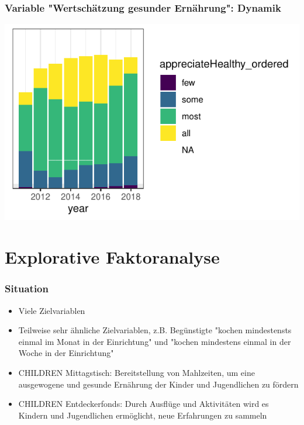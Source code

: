 \begin{frame}[fragile]
\frametitle{Variable "Wertschätzung gesunder Ernährung": Dynamik}
\begin{knitrout}\footnotesize
{}\color{fgcolor}

{\centering \includegraphics[width=\maxwidth]{figure/beamer-appreciateTime-1} 

}



\end{knitrout}
\end{frame}

\section{Explorative Faktoranalyse}

\begin{frame}[fragile]
\frametitle{Situation}

\begin{itemize}
 \item<1-> Viele Zielvariablen 
 \item<2-> Teilweise sehr ähnliche Zielvariablen, z.B. Begünstigte "kochen mindestensts einmal im Monat in der Einrichtung" und "kochen mindestens einmal in der Woche in der Einrichtung"
 \linebreak
 \item<3-> CHILDREN Mittagstisch: Bereitstellung von Mahlzeiten, um eine ausgewogene und gesunde Ernährung der Kinder und Jugendlichen zu fördern
 \item<4-> CHILDREN Entdeckerfonds: Durch Ausflüge und Aktivitäten wird es Kindern und Jugendlichen ermöglicht, neue Erfahrungen zu sammeln
\end{itemize}

\end{frame}


